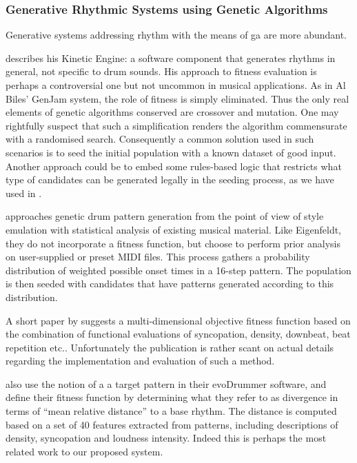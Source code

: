 \subsubsection{Generative Rhythmic Systems using Genetic Algorithms}

Generative systems addressing rhythm with the means of \acrshort{ga} are more abundant. 

\cite{Eigenfeldt2006a} describes his Kinetic Engine: a software component that generates rhythms in general, not specific to drum sounds. His approach to fitness evaluation is perhaps a controversial one but not uncommon in musical applications. As in Al Biles’ GenJam system, the role of fitness is simply eliminated. Thus the only real elements of genetic algorithms conserved are crossover and mutation. One may rightfully suspect that such a simplification renders the algorithm commensurate with a randomised search. Consequently a common solution used in such scenarios is to seed the initial population with a known dataset of good input. Another approach could be to embed some rules-based logic that restricts what type of candidates can be generated legally in the seeding process, as we have used in \citep{Nuanain2014}.

\cite{Bernardes2010} approaches genetic drum pattern generation from the point of view of style emulation with statistical analysis of existing musical material. Like Eigenfeldt, they do not incorporate a fitness function, but choose to perform prior analysis on user-supplied or preset MIDI files. This process gathers a probability distribution of weighted possible onset times in a 16-step pattern. The population is then seeded with candidates that have patterns generated according to this distribution. 

A short paper by \cite{Horowitz2004a} suggests a multi-dimensional objective fitness function based on the combination of functional evaluations of syncopation, density, downbeat, beat repetition etc.. Unfortunately the publication is rather scant on actual details regarding the implementation and evaluation of such a method. 

\cite{Kaliakatsos-Papakostas2013} also use the notion of a a target pattern in their evoDrummer software, and define their fitness function by determining what they refer to as divergence in terms of “mean relative distance” to a base rhythm. The distance is computed based on a set of 40 features extracted from patterns, including descriptions of density, syncopation and loudness intensity. Indeed this is perhaps the most related work to our proposed system. 

